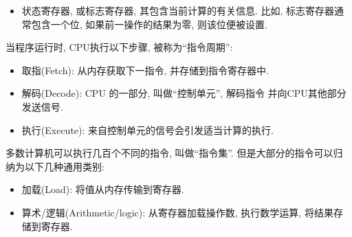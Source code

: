 \documentclass[12pt]{book}
\begin{document}
{\begin{itemize}
\item 状态寄存器, 或标志寄存器, 其包含当前计算的有关信息. 比如, 
标志寄存器通常包含一个位, 如果前一操作的结果为零, 则该位便被设置. 
  

\end{itemize}

当程序运行时, CPU执行以下步骤, 被称为``指令周期'':

\begin{itemize}

\item 取指(Fetch): 从内存获取下一指令, 并存储到指令寄存器中. 

\item 解码(Decode): CPU 的一部分, 叫做``控制单元'', 解码指令
并向CPU其他部分发送信号. 

\item 执行(Execute): 来自控制单元的信号会引发适当计算的执行.

\end{itemize}

多数计算机可以执行几百个不同的指令, 叫做``指令集''. 
但是大部分的指令可以归纳为以下几种通用类别:

\begin{itemize}

\item 加载(Load): 将值从内存传输到寄存器.

\item 算术/逻辑(Arithmetic/logic): 从寄存器加载操作数, 执行数学运算,
将结果存储到寄存器.


\end{itemize}}
\end{document}

